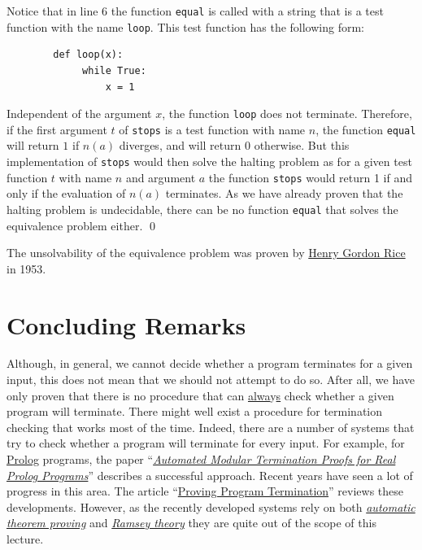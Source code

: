 Notice that in line 6 the function \texttt{equal} is called with a string that is a test function with the
name \texttt{loop}.  This test function has the following form:
\begin{verbatim}
        def loop(x): 
             while True:
                 x = 1
\end{verbatim}
Independent of the argument $x$, the function \texttt{loop} does not terminate.
Therefore, if the first argument $t$ of \texttt{stops} is a test function with name $n$, 
the function \texttt{equal} will return $1$ if $n(a)$ diverges, and will return $0$ otherwise.
But this implementation of \texttt{stops} would then solve the halting problem as
for a given test function $t$ with name $n$ and argument $a$ the function \texttt{stops} would
return 1 if and only if the evaluation of $n(a)$ terminates.  As we have already proven that the
halting problem is undecidable, there can be no function \texttt{equal} that solves the equivalence
problem either.
\qed

\remarkEng
The unsolvability of the equivalence problem was proven by \href{http://en.wikipedia.org/wiki/Henry_Gordon_Rice}{Henry Gordon Rice} \cite{rice:1953} in 1953.
\eox
\pagebreak

\section{Concluding Remarks}
Although, in general, we cannot decide whether a program terminates for a given input, this does not mean
that we should not attempt to do so.  After all, we have only proven that there is no procedure that
can \underline{alwa}y\underline{s} check whether a given program will terminate.  There might well exist a
procedure for termination checking that works most of the time.  Indeed, there are a number of
systems that try to check whether a program will terminate for every input.  For example, for
\href{https://en.wikipedia.org/wiki/Prolog}{Prolog}
programs, the paper
``\href{http://link.springer.com/chapter/10.1007%2F3-540-61739-6_44}{\emph{Automated Modular Termination Proofs for Real Prolog Programs}}''
\cite{mueller:1996} describes a successful approach.  Recent years have seen a lot of progress in
this area.  The article 
``\href{http://dl.acm.org/citation.cfm?id=1941509}{{Proving Program Termination}}''
\cite{cook:2011} reviews these developments.  However, as the recently developed systems rely on both
\href{http://en.wikipedia.org/wiki/Automated_theorem_proving}{\emph{automatic theorem proving}} and
\href{http://en.wikipedia.org/wiki/Ramsey_theory}{\emph{Ramsey theory}} they are quite out of the
scope of this lecture.

